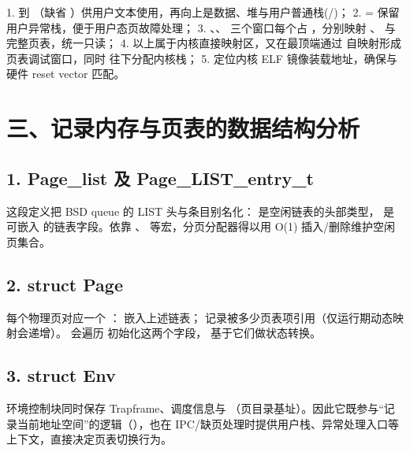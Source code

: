 \documentclass[12pt,oneside]{ctexbook}
\begin{document}
1.  到 （缺省 ）供用户文本使用，再向上是数据、堆与用户普通栈(/)；
2. = 保留用户异常栈，便于用户态页故障处理；
3. 、、 三个窗口每个占 ，分别映射 、 与完整页表，统一只读；
4.  以上属于内核直接映射区，又在最顶端通过  自映射形成页表调试窗口，同时  往下分配内核栈；
5.  定位内核 ELF 镜像装载地址，确保与硬件 reset vector 匹配。

\section*{三、记录内存与页表的数据结构分析}

\subsection*{1. Page\_list 及 Page\_LIST\_entry\_t}
这段定义把 BSD queue 的 LIST 头与条目别名化： 是空闲链表的头部类型， 是可嵌入  的链表字段。依靠 、 等宏，分页分配器得以用 O(1) 插入/删除维护空闲页集合。

\subsection*{2. struct Page}
每个物理页对应一个 ： 嵌入上述链表； 记录被多少页表项引用（仅运行期动态映射会递增）。 会遍历  初始化这两个字段， 基于它们做状态转换。

\subsection*{3. struct Env}
环境控制块同时保存 Trapframe、调度信息与 （页目录基址）。因此它既参与“记录当前地址空间”的逻辑（），也在 IPC/缺页处理时提供用户栈、异常处理入口等上下文，直接决定页表切换行为。
\end{document}

